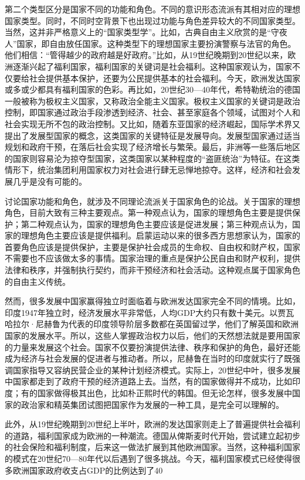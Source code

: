 第二个类型区分是国家不同的功能和角色。不同的意识形态流派有其相对应的理想国家类型。同时，不同时空背景下也出现过功能与角色差异较大的不同国家类型。当然，这并非严格意义上的“国家类型学”。比如，古典自由主义欣赏的是“守夜人”国家，即自由放任国家。这种类型下的理想国家主要扮演警察与法官的角色。他们相信：“管得越少的政府越是好政府。”比如，从19世纪晚期到20世纪以来，欧洲逐渐兴起了福利国家，福利国家的关键词是社会福利。这种国家观认为，国家不仅要给社会提供基本保护，还要为公民提供基本的社会福利。今天，欧洲发达国家或多或少都具有福利国家的色彩。再比如，20世纪30—40年代，希特勒统治的德国一般被称为极权主义国家，又称政治全能主义国家。极权主义国家的关键词是政治控制，即国家通过政治手段渗透到经济、社会、甚至家庭各个领域，试图对个人和社会实现无所不包的政治控制。又比如，随着东亚国家的经济崛起，国际学术界又提出了发展型国家的概念，这类国家的关键特征是发展导向。发展型国家通过适当规划和政府干预，在落后社会实现了经济增长与繁荣。最后，非洲等一些落后地区的国家则容易沦为掠夺型国家，这类国家以某种程度的“盗匪统治”为特征。在这类情形下，统治集团利用国家权力对社会进行肆无忌惮地掠夺。这样，经济和社会发展几乎是没有可能的。

讨论国家功能和角色，就涉及不同理论流派关于国家角色的论战。关于国家的理想角色，目前大致有三种主要观点。第一种观点认为，国家的理想角色主要是提供保护；第二种观点认为，国家的理想角色主要应该是促进发展；第三种观点认为，国家的理想角色主要应该是提供福利。启蒙运动以来的很多西方思想家认为，国家的首要角色应该是提供保护，主要是保护社会成员的生命权、自由权和财产权，国家不需要也不应该做太多的事情。国家治理的重点是保护公民自由和财产权利，提供法律和秩序，并强制执行契约，而非干预经济和社会活动。这种观点属于国家角色的自由主义传统。

然而，很多发展中国家赢得独立时面临着与欧洲发达国家完全不同的情境。比如，印度1947年独立时，经济发展水平非常低，人均GDP大约只有数十美元。以贾瓦哈拉尔·尼赫鲁为代表的印度领导阶层多数都在英国留过学，他们了解英国和欧洲国家的发展水平。所以，这些人掌握政治权力以后，他们的天然想法就是要用国家的力量来发展这个社会。国家不仅要扮演提供法律、秩序和保护的角色，最好还能成为经济与社会发展的促进者与推动者。所以，尼赫鲁在当时的印度就实行了既强调国家指导又容纳民营企业的某种计划经济模式。实际上，20世纪中叶，很多发展中国家都走到了政府干预的经济道路上去。当然，有的国家做得并不成功，比如印度；有的国家做得极其出色，比如朴正熙时代的韩国。但无论怎样，很多发展中国家的政治家和精英集团试图把国家作为发展的一种工具，是完全可以理解的。

此外，从19世纪晚期到20世纪上半叶，欧洲的发达国家则走上了普遍提供社会福利的道路，福利国家成为欧洲的一种潮流。德国从俾斯麦时代开始，尝试建立起初步的社会保险和福利制度，后来这一做法扩展到其他欧洲国家。当然，这种福利国家的模式在20世纪70—80年代以后遇到了很多挑战。今天，福利国家模式已经使得很多欧洲国家政府收支占GDP的比例达到了40%

